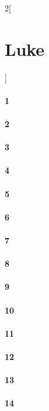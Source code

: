 \documentclass{book}
\begin{document}
\begin{multicols}{2}[\part{Luke}]
\subsection*{1}
\subsection*{2}
\subsection*{3}
\subsection*{4}
\subsection*{5}
\subsection*{6}
\subsection*{7}
\subsection*{8}
\subsection*{9}
\subsection*{10}
\subsection*{11}
\subsection*{12}
\subsection*{13}
\subsection*{14}

\end{multicols}
\end{document}
